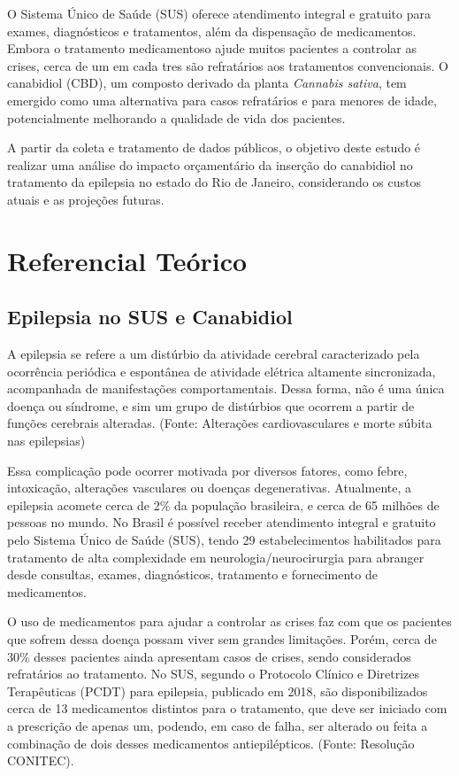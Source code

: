 \documentclass[article,a4paper,12pt,brazil,sumario=tradicional]{abntex2}
\begin{document}
O Sistema Único de Saúde (SUS) oferece atendimento integral e gratuito para exames, diagnósticos e tratamentos, além da dispensação de medicamentos. Embora o tratamento medicamentoso ajude muitos pacientes a controlar as crises, cerca de um em cada tres são refratários aos tratamentos convencionais. O canabidiol (CBD), um composto derivado da planta \textit{Cannabis sativa}, tem emergido como uma alternativa para casos refratários e para menores de idade, potencialmente melhorando a qualidade de vida dos pacientes.

A partir da coleta e tratamento de dados públicos, o objetivo deste estudo é realizar uma análise do impacto orçamentário da inserção do canabidiol no tratamento da epilepsia no estado do Rio de Janeiro, considerando os custos atuais e as projeções futuras.

\section{Referencial Teórico}

\subsection{Epilepsia no SUS e Canabidiol}
A epilepsia se refere a um distúrbio da atividade cerebral caracterizado pela ocorrência periódica e espontânea de atividade elétrica altamente sincronizada, acompanhada de manifestações comportamentais. Dessa forma, não é uma única doença ou síndrome, e sim um grupo de distúrbios que ocorrem a partir de funções cerebrais alteradas. (Fonte: Alterações cardiovasculares e morte súbita nas epilepsias)

Essa complicação pode ocorrer motivada por diversos fatores, como febre, intoxicação, alterações vasculares ou doenças degenerativas. Atualmente, a epilepsia acomete cerca de 2\% da população brasileira, e cerca de 65 milhões de pessoas no mundo. No Brasil é possível receber atendimento integral e gratuito pelo Sistema Único de Saúde (SUS), tendo 29 estabelecimentos habilitados para tratamento de alta complexidade em neurologia/neurocirurgia para abranger desde consultas, exames, diagnósticos, tratamento e fornecimento de medicamentos.

O uso de medicamentos para ajudar a controlar as crises faz com que os pacientes que sofrem dessa doença possam viver sem grandes limitações. Porém, cerca de 30\% desses pacientes ainda apresentam casos de crises, sendo considerados refratários ao tratamento. No SUS, segundo o Protocolo Clínico e Diretrizes Terapêuticas (PCDT) para epilepsia, publicado em 2018, são disponibilizados cerca de 13 medicamentos distintos para o tratamento, que deve ser iniciado com a prescrição de apenas um, podendo, em caso de falha, ser alterado ou feita a combinação de dois desses medicamentos antiepilépticos. (Fonte: Resolução CONITEC).
\end{document}
